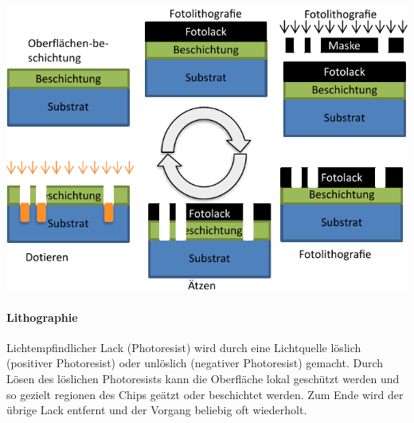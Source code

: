 \begin{minipage}[t]{0.5\columnwidth}
    \includegraphics[width=\columnwidth, align=t]{images/01_technologie_grundprozess_skript.pdf}
\end{minipage}
\hfill
\begin{minipage}[t]{0.48\columnwidth}
    \paragraph{Lithographie}
    Lichtempfindlicher Lack (Photoresist) wird durch eine Lichtquelle löslich (positiver Photoresist) oder unlöslich (negativer Photoresist) gemacht.
    Durch Lösen des löslichen Photoresists kann die Oberfläche lokal geschützt werden und so gezielt regionen des Chips geätzt oder beschichtet werden.
    Zum Ende wird der übrige Lack entfernt und der Vorgang beliebig oft wiederholt.
\end{minipage}




